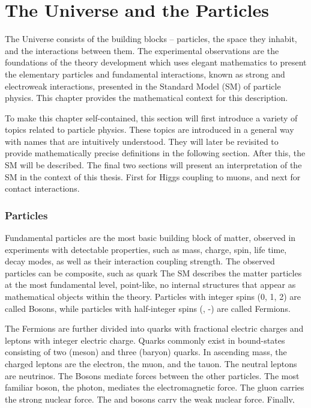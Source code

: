 \section{The Universe and the Particles}

The Universe consists of the building blocks -- particles, the space they inhabit, and the interactions between them.
The experimental observations are the foundations of the theory development which uses elegant mathematics to present the elementary particles and fundamental interactions, known as strong and electroweak interactions, presented in the Standard Model (SM) of particle physics.
This chapter provides the mathematical context for this description.

To make this chapter self-contained, this section will first introduce a variety of topics related to particle physics.
These topics are introduced in a general way with names that are intuitively understood.
They will later be revisited to provide mathematically precise definitions in the following section.
After this, the SM will be described.
The final two sections will present an interpretation of the SM in the context of this thesis. First for Higgs coupling to muons, and next for contact interactions.

\subsubsection{Particles}
Fundamental particles are the most basic building block of matter, observed in experiments with detectable properties, such as mass, charge, spin, life time, decay modes, as well as their interaction coupling strength.
The observed particles can be composite, such as quark
The SM describes the matter particles at the most fundamental level, point-like, no internal structures that appear as mathematical objects within the theory.
Particles with integer spins (0, 1, 2) are called Bosons, while particles with half-integer spins (\half, -\half) are called Fermions.

The Fermions are further divided into quarks with fractional electric charges and leptons with integer electric charge.
Quarks commonly exist in bound-states consisting of two (meson) and three (baryon) quarks.
In ascending mass, the charged leptons are the electron, the muon, and the tauon.
The neutral leptons are neutrinos.
The Bosons mediate forces between the other particles.
The most familiar boson, the photon, mediates the electromagnetic force.
The gluon carries the strong nuclear force.
The \W and \Z bosons carry the weak nuclear force.
Finally, the recently discovered Higgs boson mediates a momentum exchange between particles.

